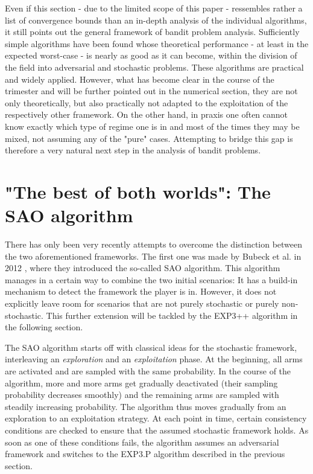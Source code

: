 \documentclass[10.5pt]{article}
\begin{document}
Even if this section - due to the limited scope of this paper - ressembles rather a list of convergence bounds than an in-depth analysis of the individual algorithms, it still points out the general framework of bandit problem analysis. Sufficiently simple algorithms have been found whose theoretical performance - at least in the expected worst-case - is nearly as good as it can become, within the division of the field into adversarial and stochastic problems. These algorithms are practical and widely applied. However, what has become clear in the course of the trimester and will be further pointed out in the numerical section, they are not only theoretically, but also practically not adapted to the exploitation of the respectively other framework. On the other hand, in praxis one often cannot know exactly which type of regime one is in and most of the times they may be mixed, not assuming any of the "pure" cases. Attempting to bridge this gap is therefore a very natural next step in the analysis of bandit problems.

\section*{"The best of both worlds": The SAO algorithm}

There has only been very recently attempts to overcome the distinction between the two aforementioned frameworks. The first one was made by Bubeck et al. in 2012 \cite{Bube12}, where they introduced the so-called SAO algorithm. This algorithm manages in a certain way to combine the two initial scenarios: It has a build-in mechanism to detect the framework the player is in. However, it does not explicitly leave room for scenarios that are not purely stochastic or purely non-stochastic. This further extension will be tackled by the EXP3++ algorithm in the following section.

The SAO algorithm starts off with classical ideas for the stochastic framework, interleaving an \textit{exploration} and an \textit{exploitation} phase. At the beginning, all arms are activated and are sampled with the same probability. In the course of the algorithm, more and more arms get gradually deactivated (their sampling probability decreases smoothly) and the remaining arms are sampled with steadily increasing probability. The algorithm thus moves gradually from an exploration to an exploitation strategy. At each point in time, certain consistency conditions are checked to ensure that the assumed stochastic framework holds. As soon as one of these conditions fails, the algorithm assumes an adversarial framework and switches to the EXP3.P algorithm described in the previous section. 
\end{document}
